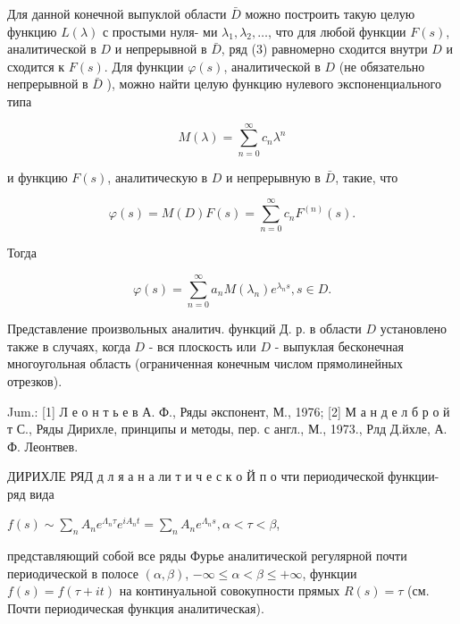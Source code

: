 \documentclass[10pt]{article}
\begin{document}
Для данной конечной выпуклой области $\bar{D}$ можно построить такую целую функцию $L(\lambda)$ с простыми нуля- ми $\lambda_{1}, \lambda_{2}, \ldots$, что для любой функции $F(s)$, аналитической в $D$ и непрерывной в $\bar{D}$, ряд (3) равномерно сходится внутри $D$ и сходится к $F(s)$. Для функции $\varphi(s)$, аналитической в $D$ (не обязательно непрерывной в $\bar{D}$ ), можно найти целую функцию нулевого экспоненциального типа



\[

M(\lambda)=\sum_{n=0}^{\infty} c_{n} \lambda^{n}

\]



и функцию $F(s)$, аналитическую в $D$ и непрерывную в $\bar{D}$, такие, что



\[

\varphi(s)=M(D) F(s)=\sum_{n=0}^{\infty} c_{n} F^{(n)}(s) .

\]



Тогда



\[

\varphi(s)=\sum_{n=0}^{\infty} a_{n} M\left(\lambda_{n}\right) e^{\lambda_{n} s}, s \in D .

\]



Представление произвольных аналитич. функций Д. р. в области $D$ установлено также в случаях, когда $D$ - вся плоскость или $D$ - выпуклая бесконечная многоугольная область (ограниченная конечным числом прямолинейных отрезков).



Jum.: [1] Л е о н т ь е в А. Ф., Ряды әкспонент, М., 1976; [2] М а н д е л б р о й т С., Ряды Дирихле, принципы и методы, пер. с англ., М., 1973., Рлд Д.йхле, А. Ф. Леонтвев.



ДИРИХЛЕ РЯД д л я а н а ли т и ч е с к о Й п о чти периодической функции-ряд вида



$f(s) \sim \sum_{n} A_{n} e^{\Lambda_{n} \tau} e^{i A_{n} t}=\sum_{n} A_{n} e^{\Lambda_{n} s}, \alpha<\tau<\beta$,



представляющий собой все ряды Фурье аналитической регулярной почти периодической в полосе $(\alpha, \beta)$, $-\infty \leqslant \alpha<\beta \leqslant+\infty$, функции $f(s)=f(\tau+i t)$ на континуальной совокупности прямых $R(s)=\tau$ (см. Почти периодическая функция аналитическая).
\end{document}
